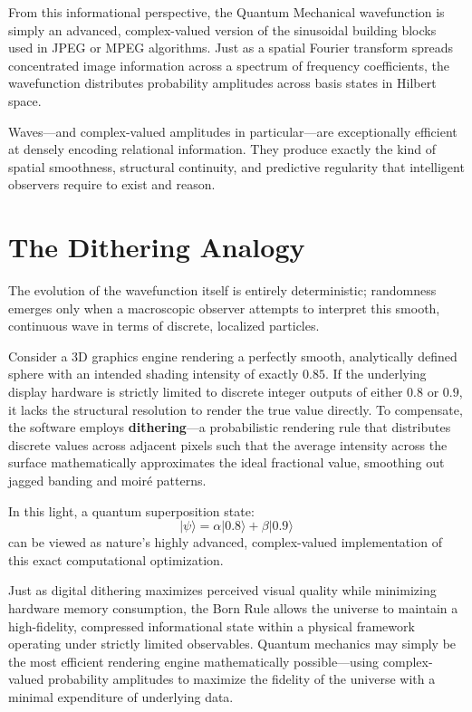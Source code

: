 From this informational perspective, the Quantum Mechanical wavefunction is simply an advanced, complex-valued version of the sinusoidal building blocks used in JPEG or MPEG algorithms.
Just as a spatial Fourier transform spreads concentrated image information across a spectrum of frequency coefficients, the wavefunction distributes probability amplitudes across basis states in Hilbert space.

Waves—and complex-valued amplitudes in particular—are exceptionally efficient at densely encoding relational information.
They produce exactly the kind of spatial smoothness, structural continuity, and predictive regularity that intelligent observers require to exist and reason.

\section{The Dithering Analogy}

The evolution of the wavefunction itself is entirely deterministic; randomness emerges only when a macroscopic observer attempts to interpret this smooth, continuous wave in terms of discrete, localized particles. 

Consider a 3D graphics engine rendering a perfectly smooth, analytically defined sphere with an intended shading intensity of exactly $0.85$.
If the underlying display hardware is strictly limited to discrete integer outputs of either $0.8$ or $0.9$, it lacks the structural resolution to render the true value directly.
To compensate, the software employs \textbf{dithering}—a probabilistic rendering rule that distributes discrete values across adjacent pixels such that the average intensity across the surface mathematically approximates the ideal fractional value, smoothing out jagged banding and moiré patterns.

In this light, a quantum superposition state:
\[
|\psi\rangle = \alpha |0.8\rangle + \beta |0.9\rangle
\]
can be viewed as nature’s highly advanced, complex-valued implementation of this exact computational optimization. 

Just as digital dithering maximizes perceived visual quality while minimizing hardware memory consumption, the Born Rule allows the universe to maintain a high-fidelity, compressed informational state within a physical framework operating under strictly limited observables.
Quantum mechanics may simply be the most efficient rendering engine mathematically possible—using complex-valued probability amplitudes to maximize the fidelity of the universe with a minimal expenditure of underlying data.

